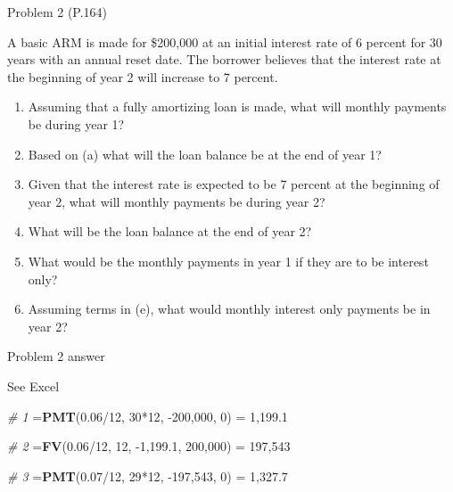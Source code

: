 \documentclass[ignorenonframetext,]{beamer}
\newenvironment{Shaded}{\begin{snugshade}}{\end{snugshade}}
\newcommand{\KeywordTok}[1]{\textcolor[rgb]{0.13,0.29,0.53}{\textbf{{#1}}}}
\newcommand{\DecValTok}[1]{\textcolor[rgb]{0.00,0.00,0.81}{{#1}}}
\newcommand{\FloatTok}[1]{\textcolor[rgb]{0.00,0.00,0.81}{{#1}}}
\newcommand{\StringTok}[1]{\textcolor[rgb]{0.31,0.60,0.02}{{#1}}}
\newcommand{\CommentTok}[1]{\textcolor[rgb]{0.56,0.35,0.01}{\textit{{#1}}}}
\newcommand{\NormalTok}[1]{{#1}}
\providecommand{\tightlist}{%
\setlength{\itemsep}{0pt}\setlength{\parskip}{0pt}}
\begin{document}
\begin{frame}{Problem 2 (P.164)}

\small

A basic ARM is made for \$200,000 at an initial interest rate of 6
percent for 30 years with an annual reset date. The borrower believes
that the interest rate at the beginning of year 2 will increase to 7
percent.

\begin{enumerate}
\def\labelenumi{\alph{enumi}.}
\tightlist
\item
  Assuming that a fully amortizing loan is made, what will monthly
  payments be during year 1?
\item
  Based on (a) what will the loan balance be at the end of year 1?
\item
  Given that the interest rate is expected to be 7 percent at the
  beginning of year 2, what will monthly payments be during year 2?
\item
  What will be the loan balance at the end of year 2?
\item
  What would be the monthly payments in year 1 if they are to be
  interest only?
\item
  Assuming terms in (e), what would monthly interest only payments be in
  year 2?
\end{enumerate}

\end{frame}

\begin{frame}[fragile]{Problem 2 answer}

\begin{Shaded}
\begin{Highlighting}[]
\NormalTok{See Excel}

\CommentTok{# 1}
\NormalTok{=}\KeywordTok{PMT}\NormalTok{(}\FloatTok{0.06}\NormalTok{/}\DecValTok{12}\NormalTok{, }\DecValTok{30}\NormalTok{*}\DecValTok{12}\NormalTok{, -}\DecValTok{200}\NormalTok{,}\DecValTok{000}\NormalTok{, }\DecValTok{0}\NormalTok{) =}\StringTok{ }\DecValTok{1}\NormalTok{,}\FloatTok{199.1}

\CommentTok{# 2}
\NormalTok{=}\KeywordTok{FV}\NormalTok{(}\FloatTok{0.06}\NormalTok{/}\DecValTok{12}\NormalTok{, }\DecValTok{12}\NormalTok{, -}\DecValTok{1}\NormalTok{,}\FloatTok{199.1}\NormalTok{, }\DecValTok{200}\NormalTok{,}\DecValTok{000}\NormalTok{) =}\StringTok{ }\DecValTok{197}\NormalTok{,}\DecValTok{543}

\CommentTok{# 3}
\NormalTok{=}\KeywordTok{PMT}\NormalTok{(}\FloatTok{0.07}\NormalTok{/}\DecValTok{12}\NormalTok{, }\DecValTok{29}\NormalTok{*}\DecValTok{12}\NormalTok{, -}\DecValTok{197}\NormalTok{,}\DecValTok{543}\NormalTok{, }\DecValTok{0}\NormalTok{) =}\StringTok{ }\DecValTok{1}\NormalTok{,}\FloatTok{327.7}
\end{Highlighting}
\end{Shaded}

\end{frame}
\end{document}
